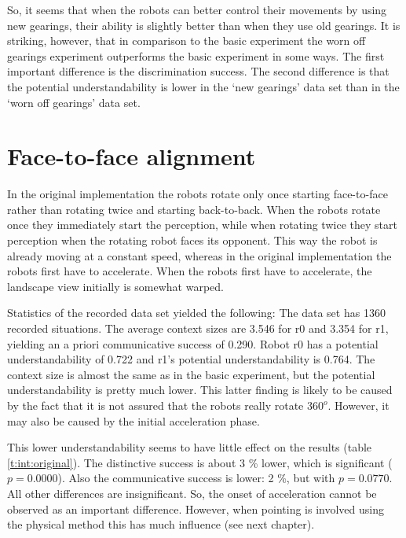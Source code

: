 \p
So, it seems that when the robots can better control their movements by using new gearings, their ability is slightly better than when they use old gearings. It is striking, however, that in comparison to the basic experiment the worn off gearings experiment outperforms the basic experiment in some ways. The first important difference is the discrimination success. The second difference is that the potential understandability is lower in the `new gearings' data set than in the `worn off gearings' data set. 

\section{Face-to-face alignment}\label{s:int:original}

In the original implementation the robots rotate only once starting face-to-face \cite{steelsvogt:1997} rather than rotating twice and starting back-to-back. When the robots rotate once they immediately start the perception, while when rotating twice they start perception when the rotating robot faces its opponent. This way the robot is already moving at a constant speed, whereas in the original implementation the robots first have to accelerate. When the robots first have to accelerate, the landscape view initially is somewhat warped. 

Statistics of the recorded data set yielded the following: The data set has 1360 recorded situations. The average context sizes are 3.546 for r0 and 3.354 for r1, yielding an a priori communicative success of 0.290. Robot r0 has a potential understandability of 0.722 and r1's potential understandability is 0.764. The context size is almost the same as in the basic experiment, but the potential understandability is pretty much lower. This latter finding is likely to be caused by the fact that it is not assured that the robots really rotate $360^o$. However, it may also be caused by the initial acceleration phase.

This lower understandability seems to have little effect on the results (table \ref{t:int:original}). The distinctive success is about 3 \% lower, which is significant ($p=0.0000$). Also the communicative success is lower: 2 \%, but with $p=0.0770$. All other differences are insignificant. So, the onset of acceleration cannot be observed as an important difference. However, when pointing is involved using the physical method this has much influence (see next chapter).

